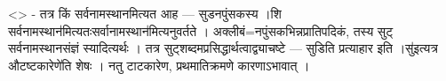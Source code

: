 \textless{}\textgreater{} - तत्र किं सर्वनामस्थानमित्यत आह ---
सुडनपुंसकस्य ।शि सर्वनामस्थान॑मित्यतःसर्वानामस्थान॑मित्यनुवर्तते ।
अक्लीबं=नपुंसकभिन्नप्रातिपदिकं, तस्य सुट् सर्वनामस्थानसंज्ञं
स्यादित्यर्थः । तत्र सुट्शब्दमप्रसिद्धार्थत्वाद्व्याचष्टे --- सुडिति
प्रत्याहार इति ।सु॑इत्यत्र औटष्टकारेणे॑ति शेषः । नतु टाटकारेण,
प्रथमातिक्रमणे कारणाऽभावात् ।
